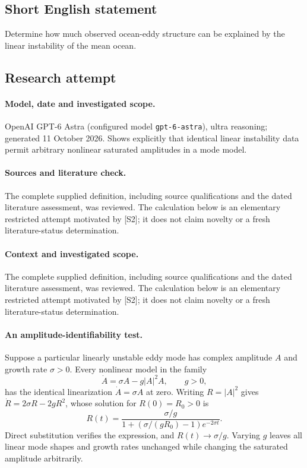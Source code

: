\documentclass[11pt]{article}
\begin{document}
\subsection{Short English statement}
Determine how much observed ocean-eddy structure can be explained by the linear instability of the mean ocean.
\subsection{Research attempt}
\paragraph{Model, date and investigated scope.}
OpenAI GPT-6 Astra (configured model \texttt{gpt-6-astra}), ultra reasoning; generated 11 October 2026. Shows explicitly that identical linear instability data permit arbitrary nonlinear saturated amplitudes in a mode model.

\paragraph{Sources and literature check.}
The complete supplied definition, including source qualifications and the dated literature assessment, was reviewed. The calculation below is an elementary restricted attempt motivated by [S2]; it does not claim novelty or a fresh literature-status determination.

\paragraph{Context and investigated scope.} The complete supplied definition, including source qualifications and the dated literature assessment, was reviewed. The calculation below is an elementary restricted attempt motivated by [S2]; it does not claim novelty or a fresh literature-status determination.

\paragraph{An amplitude-identifiability test.} Suppose a particular linearly unstable eddy mode has complex amplitude $A$ and growth rate $\sigma>0$. Every nonlinear model in the family
\[
 \dot A=\sigma A-g|A|^2A,\qquad g>0,
\]
has the identical linearization $\dot A=\sigma A$ at zero. Writing $R=|A|^2$ gives $\dot R=2\sigma R-2gR^2$, whose solution for $R(0)=R_0>0$ is
\[
 R(t)=\frac{\sigma/g}{1+(\sigma/(gR_0)-1)e^{-2\sigma t}}.
\]
Direct substitution verifies the expression, and $R(t)\to\sigma/g$. Varying $g$ leaves all linear mode shapes and growth rates unchanged while changing the saturated amplitude arbitrarily.
\end{document}
